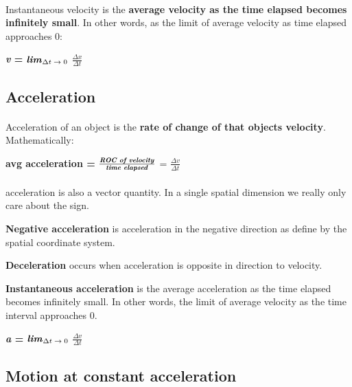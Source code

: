 \documentclass[12pt, a4paper]{article}
\begin{document}
\paragraph*{}
Instantaneous velocity is the \textbf{average velocity as the time elapsed becomes infinitely small}.
In other words, as the limit of average velocity as time elapsed approaches 0:

{
    \centering
    \textbf{\textit{v} = } $\textrm{\textbf{\textit{lim}}}_{\textrm{$\Delta t \rightarrow 0$}}$ 
    \textbf{${\frac{\textrm{$\Delta x$}}{\textrm{$\Delta t$}}}$}

}

\subsection{Acceleration}
\paragraph*{}
Acceleration of an object is the \textbf{rate of change of that objects velocity}. Mathematically:

{
    \centering
    \textbf{avg acceleration =} $\frac{\textbf{\textit{ROC of velocity}}}{\textrm{\textbf{\textit{time elapsed}}}}$ = 
    \textbf{${\frac{\textrm{$\Delta v$}}{\textrm{$\Delta t$}}}$}

} 

\paragraph*{}
acceleration is also a vector quantity. In a single spatial dimension we really only care about
the sign. 

\textbf{Negative acceleration} is acceleration in the negative direction as define by the spatial coordinate system.

\textbf{Deceleration} occurs when acceleration is opposite in direction to velocity.

\textbf{Instantaneous acceleration} is the average acceleration as the time elapsed becomes infinitely small.
In other words, the limit of average velocity as the time interval approaches 0. 

{
    \centering
    \textbf{\textit{a } = } $\textrm{\textbf{\textit{lim}}}_{\textrm{$\Delta t \rightarrow 0$}}$ 
    \textbf{${\frac{\textrm{$\Delta v$}}{\textrm{$\Delta t$}}}$}

}
\newpage

\subsection{Motion at constant acceleration}
\end{document}
